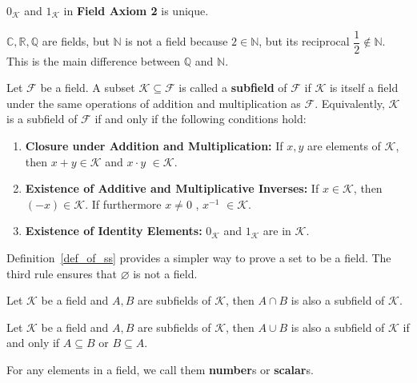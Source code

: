 	\begin{corollaryenv}
		$0_\mathcal{K}$ and $1_\mathcal{K}$ in \textbf{Field Axiom 2} is unique.
	\end{corollaryenv}
	\begin{exampleenv}
		$\mathbb{C,R,Q}$ are fields, but $\mathbb{N}$ is not a field because $2 \in \mathbb{N}$, but its reciprocal $\dfrac{1}{2} \notin \mathbb{N}$. This is the main difference between $\mathbb{Q}$ and $\mathbb{N}$.
	\end{exampleenv}
	\begin{definitionenv}\label{def_of_ss}
		Let $\mathcal{F}$ be a field. A subset $\mathcal{K} \subseteq \mathcal{F}$ is called a \textbf{subfield} of $\mathcal{F}$ if $\mathcal{K}$ is itself a field under the same operations of addition and multiplication as $\mathcal{F}$. Equivalently, $\mathcal{K}$ is a subfield of $\mathcal{F}$ if and only if the following conditions hold:
		\begin{enumerate}
			\item \textbf{Closure under Addition and Multiplication:} If $x,y$ are elements of $\mathcal{K}$, then  $x+y\in \mathcal{K}$ and $x\cdot y$ $\in \mathcal{K}$.
			\item \textbf{Existence of Additive and Multiplicative Inverses:} If $x\in \mathcal{K}$, then $(-x)\in \mathcal{K}$. If furthermore $x\neq 0$ , $x^{-1}$ $\in \mathcal{K}$.
			\item \textbf{Existence of Identity Elements:} $0_\mathcal{K}$ and $1_\mathcal{K}$ are in $\mathcal{K}$.
		\end{enumerate}
	\end{definitionenv}
	\begin{remarkenv}
		Definition~\ref{def_of_ss} provides a simpler way to prove a set to be a field. The third rule ensures that $\varnothing$ is not a field.
	\end{remarkenv}
	\begin{propositionenv}
		Let $\mathcal{K}$ be a field and $A,B$ are subfields of $\mathcal{K}$, then $A \cap B$ is also a subfield of $\mathcal{K}$.
	\end{propositionenv}
	\begin{propositionenv}
		Let $\mathcal{K}$ be a field and $A,B$ are subfields of $\mathcal{K}$, then $A \cup B$ is also a subfield of $\mathcal{K}$ if and only if $A \subseteq B$ or $B \subseteq A$.
	\end{propositionenv}
\begin{remarkenv}
	For any elements in a field, we call them \textbf{number}s or \textbf{scalar}s.
\end{remarkenv}
